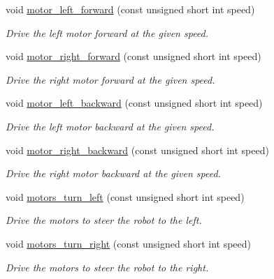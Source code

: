 \begin{DoxyCompactItemize}
void \hyperlink{classIDP_1_1HardwareAbstractionLayer_acf3d3dd4e05c4b50cb31b4d35f21abbf}{motor\_\-left\_\-forward} (const unsigned short int speed)
\begin{DoxyCompactList}\small\item\em Drive the left motor forward at the given speed. \item\end{DoxyCompactList}\item 
void \hyperlink{classIDP_1_1HardwareAbstractionLayer_aa2e2e226f2313d769e3ce226dd24d22c}{motor\_\-right\_\-forward} (const unsigned short int speed)
\begin{DoxyCompactList}\small\item\em Drive the right motor forward at the given speed. \item\end{DoxyCompactList}\item 
void \hyperlink{classIDP_1_1HardwareAbstractionLayer_a61b80e2bad5cc6a56a17350b015bfbcc}{motor\_\-left\_\-backward} (const unsigned short int speed)
\begin{DoxyCompactList}\small\item\em Drive the left motor backward at the given speed. \item\end{DoxyCompactList}\item 
void \hyperlink{classIDP_1_1HardwareAbstractionLayer_aac42c10ca431120a060f9b2c394492ae}{motor\_\-right\_\-backward} (const unsigned short int speed)
\begin{DoxyCompactList}\small\item\em Drive the right motor backward at the given speed. \item\end{DoxyCompactList}\item 
void \hyperlink{classIDP_1_1HardwareAbstractionLayer_ae38aaced2f082b6b04ebdd662349b1d2}{motors\_\-turn\_\-left} (const unsigned short int speed)
\begin{DoxyCompactList}\small\item\em Drive the motors to steer the robot to the left. \item\end{DoxyCompactList}\item 
void \hyperlink{classIDP_1_1HardwareAbstractionLayer_ad1fba0e8cb2c9ad902c8e4ec34e5e622}{motors\_\-turn\_\-right} (const unsigned short int speed)
\begin{DoxyCompactList}\small\item\em Drive the motors to steer the robot to the right. \item\end{DoxyCompactList}\item 

\end{DoxyCompactItemize}
